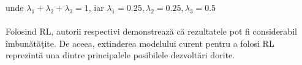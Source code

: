 unde \(\lambda_1 + \lambda_2 + \lambda_3 = 1\), iar \(\lambda_1 = 0.25, \lambda_2 = 0.25, \lambda_3 = 0.5\)

\paragraph{}
Folosind RL, autorii respectivi demonstreaz\u a c\u a rezultatele pot fi considerabil \^ imbun\u at\u a\c tite. De aceea, extinderea modelului curent pentru a folosi RL reprezint\u a una dintre principalele posibilele dezvolt\u ari dorite.

